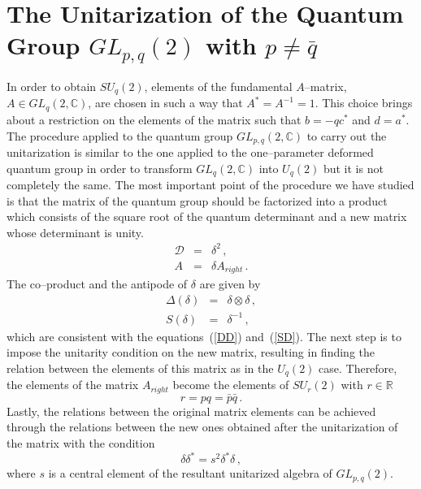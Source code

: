 \documentclass[a4paper,12pt]{article}
\numberwithin{equation}{section}
\begin{document}
\section{The Unitarization of the Quantum Group $GL_{p,q}
 \left( 2 \right)$ with $p \ne \bar q$}
 In order to obtain $SU_q \left( 2 \right)$, elements of
  the fundamental $A$--matrix, $A \in GL_q \left( 2, \mathbb{C} \right)$,
  are chosen in such a way that $A^\ast = A^{-1} = 1$.
  This choice brings about a restriction on the elements
  of the matrix such that $b = -q c^\ast$ and $d = a^\ast$.
  The procedure applied to the quantum group $GL_{p,q} \left( 2,
  \mathbb{C} \right)$ to carry out the unitarization is
  similar to the one applied to the one--parameter deformed
  quantum group in order to transform $GL_q \left( 2, \mathbb{C}
  \right)$ into $U_q \left( 2 \right)$ but it is not completely the same.
The most important point of the procedure we have studied is
  that the matrix of the quantum group should be factorized into a
  product which consists of the square root of the quantum determinant
  and a new matrix whose determinant is unity.
\begin{eqnarray}
  \mathcal{D}  &=& \delta^2 \, , \\
 A &=& \delta A_{right} \, .
\end{eqnarray}
The co--product and the antipode of $\delta$ are given by
\begin{eqnarray}
\Delta \left( \delta \right) &=& \delta \otimes \delta \, , \\
S\left( \delta \right) &=& \delta ^{-1}\, ,
\end{eqnarray}
which are consistent with the equations~(\ref{DD}) and~(\ref{SD}).
 The next step is to impose the unitarity condition on the new matrix, resulting in finding
  the relation between the elements of this matrix as in the
  $U_q \left( 2 \right)$ case. Therefore, the elements of the matrix $A_{right}$  
become the elements of $SU_r(2)$ with $r \in \mathbb{R}$ 
\begin{equation}
r = pq = \bar p \bar q \, .
\end{equation} 
Lastly, the relations between
  the original matrix elements can be achieved through the relations
  between the new ones obtained after the unitarization of the matrix with the condition
\begin{equation}
\delta \delta^\ast = s^2 \delta^\ast \delta \, ,
\end{equation}
where $s$ is a central element of the resultant unitarized algebra of $GL_{p,q} \left(2 \right)$.
\end{document}
